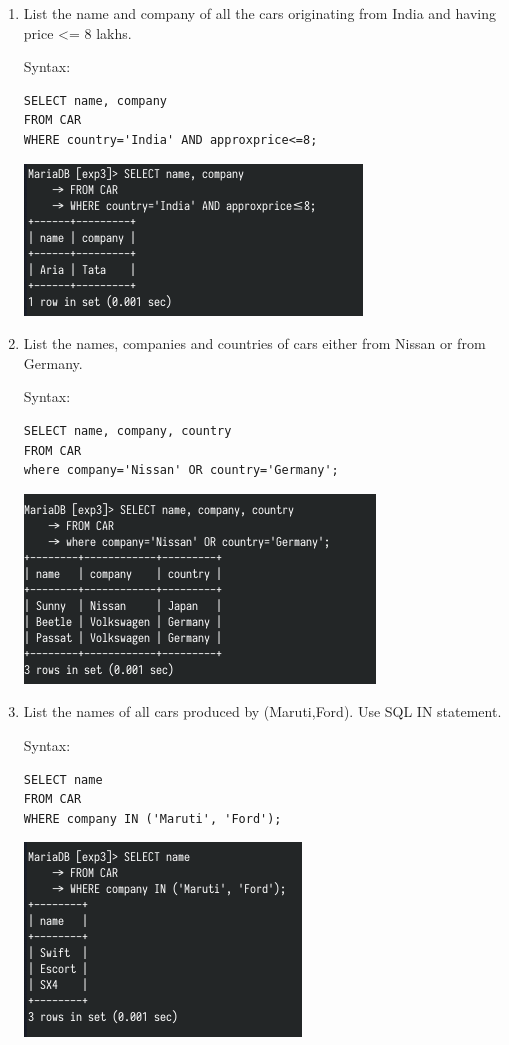 \documentclass[13pt,oneside]{book}
\begin{document}
\begin{enumerate}
\item
List the name and company of all the cars originating from India and
 having price <= 8 lakhs.
 
Syntax:
\begin{verbatim}
SELECT name, company
FROM CAR
WHERE country='India' AND approxprice<=8;

\end{verbatim}
\includegraphics[]{img/p3/ss5.png}


\item
List the names, companies and countries of cars either from Nissan or
 from Germany.
 
Syntax:
\begin{verbatim}
SELECT name, company, country
FROM CAR
where company='Nissan' OR country='Germany';

\end{verbatim}
\includegraphics[]{img/p3/ss6.png}


\item
List the names of all cars produced by (Maruti,Ford). Use SQL IN
 statement.
 
Syntax:
\begin{verbatim}
SELECT name
FROM CAR
WHERE company IN ('Maruti', 'Ford');

\end{verbatim}
\includegraphics[]{img/p3/ss7.png}



\end{enumerate}
\end{document}
